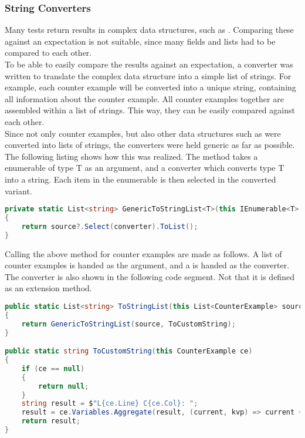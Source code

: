 \subsubsection{String Converters}
Many tests return results in complex data structures, such as .
Comparing these against an expectation is not suitable, since many fields and lists had to be compared to each other.\\
To be able to easily compare the results against an expectation, a converter was written to translate the complex data structure into a simple list of strings.
For example, each counter example will be converted into a unique string, containing all information about the counter example.
All counter examples together are assembled within a list of strings. This way, they can be easily compared against each other.\\
Since not only counter examples, but also other data structures such as  were converted into lists of strings, the converters were held generic as far as possible.
The following listing shows how this was realized. The method takes a enumerable of type T as an argument, and a converter which converts type T into a string.
Each item in the enumerable is then selected in the converted variant.

\begin{lstlisting}[language=csharp, caption={Generic Method to Convert an IEnumerable}, captionpos=b, label={lst:genericconverter}]
private static List<string> GenericToStringList<T>(this IEnumerable<T> source, Func<T, string> converter)
{
    return source?.Select(converter).ToList();
}
\end{lstlisting}

Calling the above method for counter examples are made as follows.
A list of counter examples is handed as the argument, and a  is handed as the converter.
The converter is also shown in the following code segment.
Not that it is defined as an extension method.

\begin{lstlisting}[language=csharp, caption={Converting CounterExamples to strings}, captionpos=b, label={lst:converterCEToString}]
public static List<string> ToStringList(this List<CounterExample> source)
{
    return GenericToStringList(source, ToCustomString);
}

public static string ToCustomString(this CounterExample ce)
{
    if (ce == null)
    {
        return null;
    }
    string result = $"L{ce.Line} C{ce.Col}: ";
    result = ce.Variables.Aggregate(result, (current, kvp) => current + $"{kvp.Key} = {kvp.Value}; ");
    return result;
}
\end{lstlisting}


